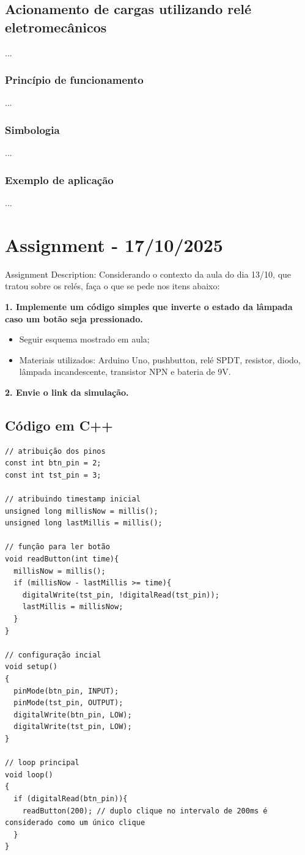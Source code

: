 \documentclass{article}
\begin{document}
\subsection{Acionamento de cargas utilizando relé eletromecânicos}
...

\subsubsection{Princípio de funcionamento}
...

\subsubsection{Simbologia}
...

\subsubsection{Exemplo de aplicação}
...


\section{Assignment - 17/10/2025}
Assignment Description: Considerando o contexto da aula do dia 13/10, que tratou sobre os relés, faça o que se pede nos itens abaixo:

\textbf{1. Implemente um código simples que inverte o estado da lâmpada caso um botão seja
pressionado.}
\begin{itemize}
      \item Seguir esquema mostrado em aula;
      \item Materiais utilizados: Arduino Uno, pushbutton, relé SPDT, resistor, diodo, lâmpada incandescente, transistor NPN e bateria de 9V.
\end{itemize}

\textbf{2. Envie o link da simulação.}

\subsection{Código em C++}
\begin{verbatim}
// atribuição dos pinos
const int btn_pin = 2;
const int tst_pin = 3;

// atribuindo timestamp inicial
unsigned long millisNow = millis();
unsigned long lastMillis = millis();

// função para ler botão
void readButton(int time){
  millisNow = millis();
  if (millisNow - lastMillis >= time){
  	digitalWrite(tst_pin, !digitalRead(tst_pin));
    lastMillis = millisNow;
  }
}

// configuração incial
void setup()
{
  pinMode(btn_pin, INPUT);
  pinMode(tst_pin, OUTPUT);
  digitalWrite(btn_pin, LOW);
  digitalWrite(tst_pin, LOW);
}

// loop principal
void loop()
{
  if (digitalRead(btn_pin)){
    readButton(200); // duplo clique no intervalo de 200ms é considerado como um único clique
  }
}
\end{verbatim}
\end{document}
